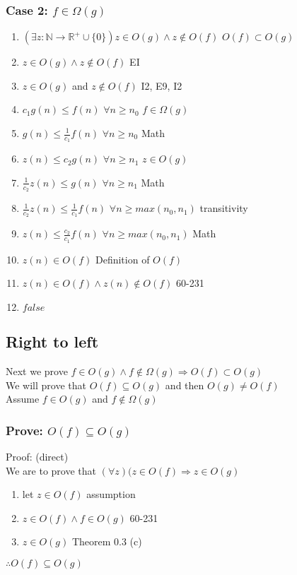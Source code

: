 \documentclass{article}
\begin{document}
      \subsubsection{Case 2: $f \in \Omega(g)$}
      \begin{enumerate}
          \item $(\exists z: \mathbb{N} \rightarrow \mathbb{R}^{+} \cup \{0\})z \in O(g) \land z \not\in O(f)$ \hfill $O(f) \subset O(g)$
          \item $z \in O(g) \land z \not\in O(f)$ \hfill EI
          \item $z \in O(g)$ and $z \not\in O(f)$ \hfill I2, E9, I2
          \item $c_{1}g(n) \leq f(n)$  $\forall n \geq n_{0}$ \hfill $f \in \Omega(g)$
          \item $g(n) \leq \frac{1}{c_{1}}f(n)$  $\forall n \geq n_{0}$ \hfill Math
          \item $z(n) \leq c_{2}g(n)$  $\forall n \geq n_{1}$ \hfill $z \in O(g)$
          \item $\frac{1}{c_{2}}z(n) \leq g(n)$  $\forall n \geq n_{1}$ \hfill Math
          \item $\frac{1}{c_{2}}z(n) \leq \frac{1}{c_{1}}f(n)$  $\forall n \geq max(n_{0}, n_{1})$ \hfill transitivity
          \item $z(n) \leq \frac{c_{2}}{c_{1}}f(n)$  $\forall n \geq max(n_{0}, n_{1})$ \hfill Math
          \item $z(n) \in O(f)$ \hfill Definition of $O(f)$
          \item $z(n) \in O(f) \land z(n) \not\in O(f)$ \hfill 60-231
          \item $false$
      \end{enumerate}
    \subsection{Right to left}
      Next we prove $f \in O(g) \land f \not\in \Omega(g) \Rightarrow O(f) \subset O(g)$ \\
      We will prove that $O(f) \subseteq O(g)$ and then $O(g) \neq O(f)$ \\
      Assume $f \in O(g)$ and $f \not\in \Omega(g)$
      \subsubsection{Prove: $O(f) \subseteq O(g)$}
      Proof: (direct) \\
      We are to prove that $(\forall z)(z \in O(f) \Rightarrow z \in O(g)$
          \begin{enumerate}
            \item let $z \in O(f)$ \hfill assumption
            \item $z \in O(f) \land f \in O(g)$ \hfill 60-231
            \item $z \in O(g)$ \hfill Theorem 0.3 (c)
          \end{enumerate}
          $\therefore O(f) \subseteq O(g)$
\end{document}
